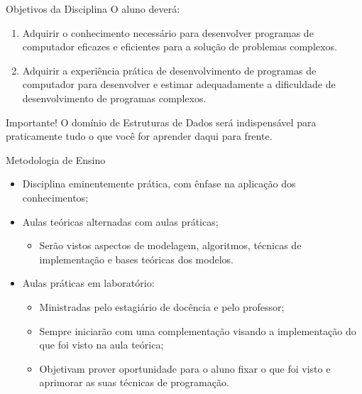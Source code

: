 \documentclass[12pt]{beamer}
\begin{document}
\begin{frame}{Objetivos da Disciplina}
O aluno deverá:
\begin{enumerate}
\item Adquirir o conhecimento necessário para desenvolver programas de computador eficazes e eficientes para a solução de problemas complexos.
\item Adquirir a experiência prática de desenvolvimento de programas de computador para desenvolver e estimar adequadamente a dificuldade de desenvolvimento de programas complexos.
\end{enumerate}
\begin{block} {Importante!}
O domínio de Estruturas de Dados será indispensável para praticamente tudo o que você for aprender daqui para frente.
\end{block}
\end{frame}

\begin{frame}{Metodologia de Ensino}
\begin{itemize}
\item Disciplina eminentemente prática, com ênfase na aplicação dos conhecimentos;
\item Aulas teóricas alternadas com aulas práticas;
\begin{itemize}
\item Serão vistos aspectos de modelagem, algoritmos, técnicas de implementação e bases teóricas dos modelos.
\end{itemize}
\item Aulas práticas em laboratório:
\begin{itemize}
\item Ministradas pelo estagiário de docência e pelo professor;
\item Sempre iniciarão com uma complementação visando a implementação do que foi visto na aula teórica;
\item Objetivam prover oportunidade para o aluno fixar o que foi visto e aprimorar as suas técnicas de programação.
\end{itemize}
\end{itemize}
\end{frame}
\end{document}
